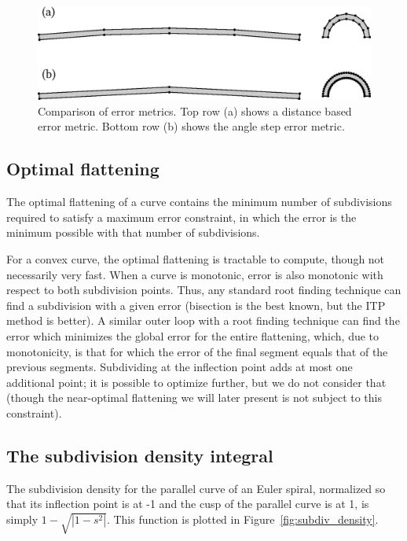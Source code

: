 \documentclass[sigconf]{acmart}
\begin{document}
\begin{figure}
    \includegraphics[scale=0.5]{angle_err}
    \caption{Comparison of error metrics. Top row (a) shows a distance based error metric. Bottom row (b) shows the angle step error metric.}
    \label{fig:angle_err}
\end{figure}

\subsection{Optimal flattening}

The optimal flattening of a curve contains the minimum number of subdivisions required to satisfy a maximum error constraint, in which the error is the minimum possible with that number of subdivisions.

For a convex curve, the optimal flattening is tractable to compute, though not necessarily very fast. When a curve is monotonic, error is also monotonic with respect to both subdivision points. Thus, any standard root finding technique can find a subdivision with a given error (bisection is the best known, but the ITP method \citet{Oliveira2020} is better). A similar outer loop with a root finding technique can find the error which minimizes the global error for the entire flattening, which, due to monotonicity, is that for which the error of the final segment equals that of the previous segments. Subdividing at the inflection point adds at most one additional point; it is possible to optimize further, but we do not consider that (though the near-optimal flattening we will later present is not subject to this constraint).

\subsection{The subdivision density integral} \label{subsection:subdiv-density-int}

The subdivision density for the parallel curve of an Euler spiral, normalized so that its inflection point is at -1 and the cusp of the parallel curve is at 1, is simply $1 - \sqrt{|1-s^2|}$. This function is plotted in Figure~\ref{fig:subdiv_density}.
\end{document}
